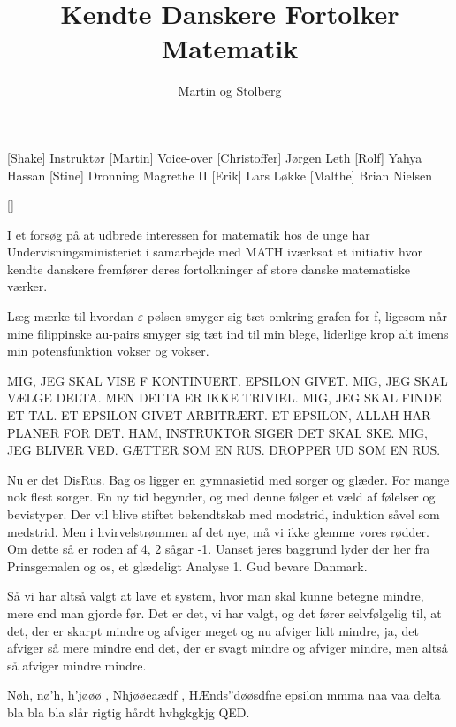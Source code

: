 \documentclass[a4paper,11pt]{article}
\title{Kendte Danskere Fortolker Matematik}
\author{Martin og Stolberg}
\begin{document}
\maketitle

\begin{roles}
[Shake] Instruktør
[Martin] Voice-over
[Christoffer] Jørgen Leth
[Rolf] Yahya Hassan
[Stine] Dronning Magrethe II
[Erik] Lars Løkke
[Malthe] Brian Nielsen
\end{roles}

\begin{props}
[]
\end{props}

\begin{sketch}
 I et forsøg på at udbrede interessen for matematik hos de unge har Undervisningsministeriet i samarbejde med MATH iværksat et initiativ hvor kendte danskere fremfører deres fortolkninger af store danske matematiske værker.


 Læg mærke til hvordan $\varepsilon$-pølsen smyger sig tæt omkring grafen for f, ligesom når mine filippinske au-pairs smyger sig tæt ind til min blege, liderlige krop alt imens min potensfunktion vokser og vokser.


 MIG, JEG SKAL VISE F KONTINUERT. EPSILON GIVET. MIG, JEG SKAL VÆLGE DELTA. MEN DELTA ER IKKE TRIVIEL. MIG, JEG SKAL FINDE ET TAL. ET EPSILON GIVET ARBITRÆRT. ET EPSILON, ALLAH HAR PLANER FOR DET. HAM, INSTRUKTOR SIGER DET SKAL SKE. MIG, JEG BLIVER VED. GÆTTER SOM EN RUS. DROPPER UD SOM EN RUS.


 Nu er det DisRus. Bag os ligger en gymnasietid med sorger og glæder. For mange nok flest sorger. En ny tid begynder, og med denne følger et væld af følelser og bevistyper. Der vil blive stiftet bekendtskab med modstrid, induktion såvel som medstrid. Men i hvirvelstrømmen af det nye, må vi ikke glemme vores rødder. Om dette så er roden af 4, 2 sågar -1. Uanset jeres baggrund lyder der her fra Prinsgemalen og os, et glædeligt Analyse 1. Gud bevare Danmark.


 Så vi har altså valgt at lave et system, hvor man skal kunne betegne mindre, mere end man gjorde før. Det er det, vi har valgt, og det fører selvfølgelig til, at det, der er skarpt mindre og afviger meget og nu afviger lidt mindre, ja, det afviger så mere mindre end det, der er svagt mindre og afviger mindre, men altså så afviger mindre mindre.


 Nøh, nø'h, h'jøøø , Nhjøøeaædf , HÆnds''døøsdfne epsilon mmma naa vaa delta
bla bla bla slår rigtig hårdt hvhgkgkjg QED.
\end{sketch}
\end{document}
